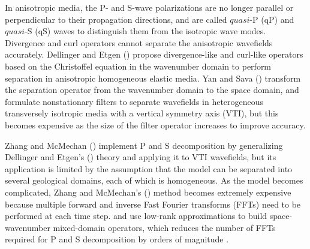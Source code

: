 \documentclass[manuscript,ulem,graphix,revised]{geophysics}
\begin{document}
In anisotropic media, the P- and S-wave polarizations are no longer parallel or perpendicular to their propagation directions, and are called $quasi$-P (qP) and $quasi$-S (qS) waves to distinguish them from the isotropic wave modes. Divergence and curl operators cannot separate the anisotropic wavefields accurately.
Dellinger and Etgen (\citeyear{dellinger90}) propose divergence-like and curl-like operators based on the Christoffel equation in the wavenumber domain to perform separation in anisotropic homogeneous elastic media. Yan and Sava (\citeyear{yan08}) transform the separation operator from the wavenumber domain to the space domain, and formulate nonstationary filters to separate wavefields in heterogeneous transversely isotropic media with a vertical symmetry axis (VTI), but this becomes expensive as the size of the filter operator increases to improve accuracy. 




Zhang and McMechan (\citeyear{zhang10}) implement P and S decomposition by generalizing Dellinger and Etgen's (\citeyear{dellinger90}) theory and applying it to VTI wavefields, but its application is limited by the assumption that the model can be separated into several geological domains, each of which is homogeneous. As the model becomes complicated, Zhang and McMechan's (\citeyear{zhang10}) method becomes extremely expensive because multiple forward and inverse Fast Fourier transforms (FFTs) need to be performed at each time step. \citet{cheng14} and \uline{\mbox{\citet{Sripanich16}}}\marginnote{[20, 21, 32]} use low-rank approximations to build space-wavenumber mixed-domain operators, which reduces the number of FFTs required for P and S decomposition by orders of magnitude \uline{\mbox{\citep{cheng16,sun16}}}\marginnote{[10, 20, 22]}. 
\end{document}
